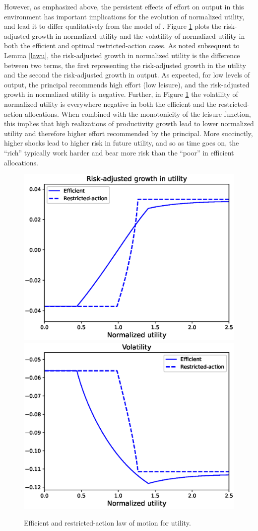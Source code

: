 \documentclass[11pt]{article}
\theoremstyle{plain}
\begin{document}
However, as emphasized above, the persistent effects of effort on output in this environment has important implications for the evolution of normalized utility, and lead it to differ qualitatively from the model of \cite{sannikov_continuous-time_2008}. Figure \ref{fig:law_u} plots the risk-adjusted growth in normalized utility and the volatility of normalized utility in both the efficient and optimal restricted-action cases. As noted subsequent to Lemma \ref{lawu}, the risk-adjusted growth in normalized utility is the difference between two terms, the first representing the risk-adjusted growth in the utility and the second the risk-adjusted growth in output. As expected, for low levels of output, the principal recommends high effort (low leisure), and the risk-adjusted growth in normalized utility is negative. Further, in Figure \ref{fig:law_u} the volatility of normalized utility is everywhere negative in both the efficient and the restricted-action allocations. When combined with the monotonicity of the leisure function, this implies that high realizations of productivity growth lead to lower normalized utility and therefore higher effort recommended by the principal. More succinctly, higher shocks lead to higher risk in future utility, and so as time goes on, the ``rich'' typically work harder and bear more risk than the ``poor'' in efficient allocations. 

\begin{figure}[!htb]
\centering
\includegraphics[width=0.49\linewidth]{risk_adj_ex}
\includegraphics[width=0.49\linewidth]{sig_u_ex}
\caption{Efficient and restricted-action law of motion for utility.}\label{fig:law_u}
\end{figure} %
\end{document}
